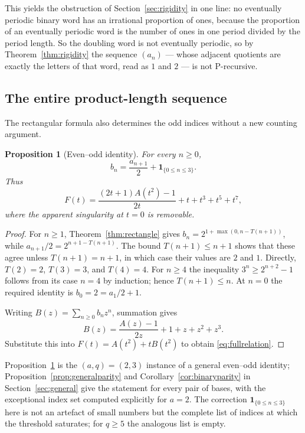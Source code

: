 \documentclass[11pt,letterpaper]{article}
\numberwithin{equation}{section}
\newtheorem{proposition}[theorem]{Proposition}
\theoremstyle{definition}
\theoremstyle{remark}
\newcommand{\ind}[1]{\boldsymbol{1}_{\{#1\}}}
\begin{document}
This yields the obstruction of Section~\ref{sec:rigidity} in one line:
no eventually periodic binary word has an irrational proportion of ones,
because the proportion of an eventually periodic word is the number of ones
in one period divided by the period length. So the doubling word is not
eventually periodic, so by Theorem~\ref{thm:rigidity} the sequence $(a_n)$
--- whose adjacent quotients are exactly the letters of that word, read as
$1$ and $2$ --- is not P-recursive.

\subsection{The entire product-length sequence}
The rectangular formula also determines the odd indices without a new
counting argument.

\begin{proposition}[Even--odd identity]\label{prop:odd}
For every $n\ge0$,
\begin{equation}\label{eq:odd}
 b_n=\frac{a_{n+1}}2+\ind{0\le n\le3}.
\end{equation}
Thus
\begin{equation}\label{eq:fullrelation}
 F(t)=\frac{(2t+1)A(t^2)-1}{2t}+t+t^3+t^5+t^7,
\end{equation}
where the apparent singularity at $t=0$ is removable.
\end{proposition}
\begin{proof}
For $n\ge1$, Theorem~\ref{thm:rectangle} gives
$b_n=2^{1+\max(0,n-T(n+1))}$, while
$a_{n+1}/2=2^{n+1-T(n+1)}$.
The bound $T(n+1)\le n+1$ shows that these agree unless
$T(n+1)=n+1$, in which case their values are $2$ and $1$.
Directly, $T(2)=2$, $T(3)=3$, and $T(4)=4$.
For $n\ge4$ the inequality $3^n\ge2^{n+2}-1$ follows from its case
$n=4$ by induction; hence $T(n+1)\le n$. At $n=0$ the required identity
is $b_0=2=a_1/2+1$.

Writing $B(z)=\sum_{n\ge0}b_nz^n$, summation gives
\[
 B(z)=\frac{A(z)-1}{2z}+1+z+z^2+z^3.
\]
Substitute this into $F(t)=A(t^2)+tB(t^2)$ to obtain
\eqref{eq:fullrelation}.
\end{proof}

Proposition~\ref{prop:odd} is the $(a,q)=(2,3)$ instance of a general
even--odd identity; Proposition~\ref{prop:generalparity} and
Corollary~\ref{cor:binaryparity} in Section~\ref{sec:general} give the
statement for every pair of bases, with the exceptional index set computed
explicitly for $a=2$. The correction $\ind{0\le n\le3}$ here is not an
artefact of small numbers but the complete list of indices at which the
threshold saturates; for $q\ge5$ the analogous list is empty.
\end{document}
